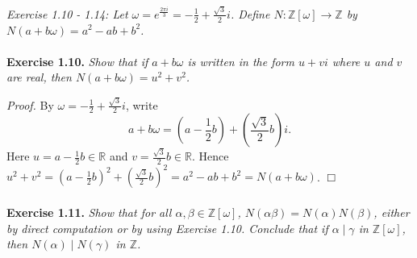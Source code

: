 \documentclass{article}
\begin{document}



\emph{Exercise 1.10 - 1.14: Let
$\omega
= e^{\frac{2\pi i}{3}}
= -\frac{1}{2}+\frac{\sqrt{3}}{2}i$.
Define $N: \mathbb{Z}[\omega] \to \mathbb{Z}$ by
$N(a+b\omega) = a^2-ab+b^2$. } \\\\



\textbf{Exercise 1.10.}
\emph{Show that if $a+b\omega$ is written in the form $u+vi$
where $u$ and $v$ are real, then $N(a+b\omega)=u^2+v^2$.}

\emph{Proof.}
By $\omega = -\frac{1}{2}+\frac{\sqrt{3}}{2}i$,
write
$$a+b\omega
= \left( a - \frac{1}{2}b \right) + \left( \frac{\sqrt{3}}{2}b \right) i.$$
Here $u = a - \frac{1}{2}b \in \mathbb{R}$ and
$v = \frac{\sqrt{3}}{2}b \in \mathbb{R}$.
Hence $u^2+v^2 = (a - \frac{1}{2}b)^2 + (\frac{\sqrt{3}}{2}b)^2 = a^2 - ab + b^2
= N(a+b\omega)$.
$\Box$ \\\\






\textbf{Exercise 1.11.}
\emph{Show that for all $\alpha, \beta \in \mathbb{Z}[\omega]$,
$N(\alpha\beta) = N(\alpha)N(\beta)$,
either by direct computation or by using Exercise 1.10.
Conclude that if $\alpha \mid \gamma$ in $\mathbb{Z}[\omega]$,
then $N(\alpha) \mid N(\gamma)$ in $\mathbb{Z}$.} \\
\end{document}
